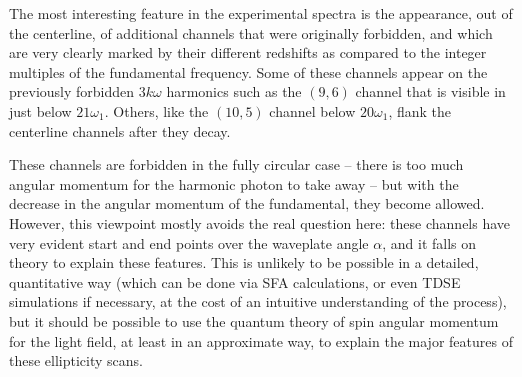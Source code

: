 The most interesting feature in the experimental spectra is the appearance, out of the centerline, of additional channels that were originally forbidden, and which are very clearly marked by their different redshifts as compared to the integer multiples of the fundamental frequency. Some of these channels appear on the previously forbidden $3k\omega$ harmonics such as the $(9,6)$ channel that is visible in  just below $21\omega_1$. Others, like the $(10,5)$ channel below $20\omega_1$, flank the centerline channels after they decay. 


These channels are forbidden in the fully circular case -- there is too much angular momentum for the harmonic photon to take away -- but with the decrease in the angular momentum of the fundamental, they become allowed. However, this viewpoint mostly avoids the real question here: these channels have very evident start and end points over the waveplate angle $\alpha$, and it falls on theory to explain these features. This is unlikely to be possible in a detailed, quantitative way (which can be done via SFA calculations, or even TDSE simulations if necessary, at the cost of an intuitive understanding of the process), but it should be possible to use the quantum theory of spin angular momentum for the light field, at least in an approximate way, to explain the major features of these ellipticity scans.


